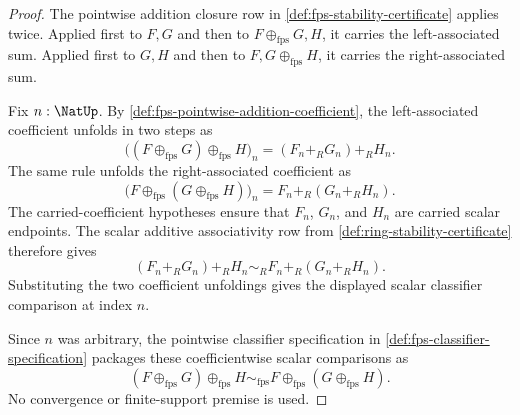 \begin{proof}
The pointwise addition closure row in \autoref{def:fps-stability-certificate} applies twice. Applied first to $F,G$ and then to $F\oplus_{\mathrm{fps}}G,H$, it carries the left-associated sum. Applied first to $G,H$ and then to $F,G\oplus_{\mathrm{fps}}H$, it carries the right-associated sum.

Fix $n:\NatUp$. By \autoref{def:fps-pointwise-addition-coefficient}, the left-associated coefficient unfolds in two steps as
$$
\bigl((F\oplus_{\mathrm{fps}}G)\oplus_{\mathrm{fps}}H\bigr)_n
=
(F_n+_R G_n)+_R H_n.
$$
The same rule unfolds the right-associated coefficient as
$$
\bigl(F\oplus_{\mathrm{fps}}(G\oplus_{\mathrm{fps}}H)\bigr)_n
=
F_n+_R(G_n+_R H_n).
$$
The carried-coefficient hypotheses ensure that $F_n$, $G_n$, and $H_n$ are carried scalar endpoints. The scalar additive associativity row from \autoref{def:ring-stability-certificate} therefore gives
$$
(F_n+_R G_n)+_R H_n
\sim_R
F_n+_R(G_n+_R H_n).
$$
Substituting the two coefficient unfoldings gives the displayed scalar classifier comparison at index $n$.

Since $n$ was arbitrary, the pointwise classifier specification in \autoref{def:fps-classifier-specification} packages these coefficientwise scalar comparisons as
$$
(F\oplus_{\mathrm{fps}}G)\oplus_{\mathrm{fps}}H
\sim_{\mathrm{fps}}
F\oplus_{\mathrm{fps}}(G\oplus_{\mathrm{fps}}H).
$$
No convergence or finite-support premise is used.
\end{proof}
